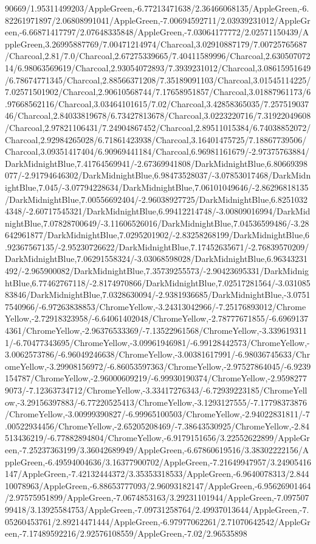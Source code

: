 {\begin{tikzternal}
90669/1.95311499203/AppleGreen,-6.77213471638/2.36466068135/AppleGreen,-6.82261971897/2.06808991041/AppleGreen,-7.00694592711/2.03939231012/AppleGreen,-6.66871417797/2.07648335848/AppleGreen,-7.03064177772/2.02571150439/AppleGreen,3.26995887769/7.00471214974/Charcoal,3.02910887179/7.00725765687/Charcoal,2.81/7.0/Charcoal,2.67275339665/7.40411589996/Charcoal,2.63050707214/6.98063569619/Charcoal,2.93054072893/7.3939231012/Charcoal,3.08615951649/6.78674771345/Charcoal,2.88566371208/7.35189091103/Charcoal,3.01545114225/7.02571501902/Charcoal,2.90610568744/7.17658951857/Charcoal,3.01887961173/6.97668562116/Charcoal,3.03464101615/7.02/Charcoal,3.42858365035/7.25751903746/Charcoal,2.84033819678/6.73427813678/Charcoal,3.0223220716/7.31922049608/Charcoal,2.97821106431/7.24904867452/Charcoal,2.89511015384/6.74038852072/Charcoal,2.92984265028/6.71861423938/Charcoal,3.16401475725/7.18867739506/Charcoal,3.09351417404/6.90969441184/Charcoal,6.96981161679/-2.97375763884/DarkMidnightBlue,7.41764569941/-2.67369941808/DarkMidnightBlue,6.80669398077/-2.91794646302/DarkMidnightBlue,6.98473528037/-3.07853017468/DarkMidnightBlue,7.045/-3.07794228634/DarkMidnightBlue,7.06101049646/-2.86296818135/DarkMidnightBlue,7.00556692404/-2.96038927725/DarkMidnightBlue,6.82510324348/-2.60717545321/DarkMidnightBlue,6.99412214748/-3.00809016994/DarkMidnightBlue,7.07828700649/-3.11606526016/DarkMidnightBlue,7.04536599486/-3.28642961877/DarkMidnightBlue,7.0295201902/-2.83258268199/DarkMidnightBlue,6.92367567135/-2.95230726622/DarkMidnightBlue,7.17452635671/-2.76839570209/DarkMidnightBlue,7.06291558324/-3.03068598028/DarkMidnightBlue,6.96343231492/-2.965900082/DarkMidnightBlue,7.35739255573/-2.90423695331/DarkMidnightBlue,6.77462767118/-2.8174970866/DarkMidnightBlue,7.02517281564/-3.03108583846/DarkMidnightBlue,7.0328630094/-2.9381936685/DarkMidnightBlue,-3.07517540966/-6.97263838853/ChromeYellow,-3.24313042966/-7.25176893012/ChromeYellow,-2.72918323958/-6.64061402048/ChromeYellow,-2.78777671855/-6.69691374361/ChromeYellow,-2.96376533369/-7.13522961568/ChromeYellow,-3.3396193111/-6.70477343695/ChromeYellow,-3.09961946981/-6.99128442573/ChromeYellow,-3.0062573786/-6.96049246638/ChromeYellow,-3.00381617991/-6.98036745633/ChromeYellow,-3.29908156972/-6.86053597363/ChromeYellow,-2.97527864045/-6.9239154787/ChromeYellow,-2.96000609219/-6.99930190374/ChromeYellow,-2.95982779073/-7.12363734712/ChromeYellow,-3.33417276343/-6.72939223185/ChromeYellow,-3.29156397883/-6.77220525413/ChromeYellow,-3.1293127555/-7.17798373876/ChromeYellow,-3.00999390827/-6.99965100503/ChromeYellow,-2.94022831811/-7.00522934456/ChromeYellow,-2.65205208469/-7.38643530925/ChromeYellow,-2.84513436219/-6.77882894804/ChromeYellow,-6.9179151656/3.22552622899/AppleGreen,-7.25237363199/3.36042689949/AppleGreen,-6.67860619516/3.38302222156/AppleGreen,-6.49594004636/3.16377900702/AppleGreen,-7.21649947957/3.24905416147/AppleGreen,-7.42132444372/3.35353318533/AppleGreen,-6.9640078313/2.84410078963/AppleGreen,-6.88653777093/2.96093182147/AppleGreen,-6.95626901464/2.97575951899/AppleGreen,-7.0674853163/3.29231101944/AppleGreen,-7.09750799418/3.13925584753/AppleGreen,-7.09731258764/2.49937013644/AppleGreen,-7.05260453761/2.89214471444/AppleGreen,-6.97977062261/2.71070642542/AppleGreen,-7.17489592216/2.92576108559/AppleGreen,-7.02/2.96535898
\end{tikzternal}}
